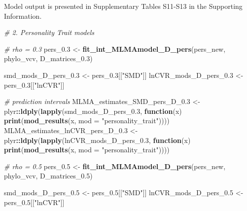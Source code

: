 \documentclass[]{article}
\newenvironment{Shaded}{\begin{snugshade}}{\end{snugshade}}
\newcommand{\KeywordTok}[1]{\textcolor[rgb]{0.13,0.29,0.53}{\textbf{#1}}}
\newcommand{\DataTypeTok}[1]{\textcolor[rgb]{0.13,0.29,0.53}{#1}}
\newcommand{\FloatTok}[1]{\textcolor[rgb]{0.00,0.00,0.81}{#1}}
\newcommand{\StringTok}[1]{\textcolor[rgb]{0.31,0.60,0.02}{#1}}
\newcommand{\CommentTok}[1]{\textcolor[rgb]{0.56,0.35,0.01}{\textit{#1}}}
\newcommand{\ControlFlowTok}[1]{\textcolor[rgb]{0.13,0.29,0.53}{\textbf{#1}}}
\newcommand{\OperatorTok}[1]{\textcolor[rgb]{0.81,0.36,0.00}{\textbf{#1}}}
\newcommand{\NormalTok}[1]{#1}
\begin{document}
Model output is presented in Supplementary Tables S11-S13 in the
Supporting Information.

\begin{Shaded}
\begin{Highlighting}[]
\CommentTok{# 2. Personality Trait models}

  \CommentTok{# rho = 0.3}
\NormalTok{    pers_}\FloatTok{0.3}\NormalTok{ <-}\StringTok{ }\KeywordTok{fit_int_MLMAmodel_D_pers}\NormalTok{(pers_new, phylo_vcv, D_matrices_}\FloatTok{0.3}\NormalTok{)}
    
\NormalTok{    smd_mods_D_pers_}\FloatTok{0.3}\NormalTok{ <-}\StringTok{ }\NormalTok{pers_}\FloatTok{0.3}\NormalTok{[[}\StringTok{"SMD"}\NormalTok{]] }
\NormalTok{    lnCVR_mods_D_pers_}\FloatTok{0.3}\NormalTok{ <-}\StringTok{ }\NormalTok{pers_}\FloatTok{0.3}\NormalTok{[[}\StringTok{"lnCVR"}\NormalTok{]] }
  
    \CommentTok{# prediction intervals}
\NormalTok{    MLMA_estimates_SMD_pers_D_}\FloatTok{0.3}\NormalTok{ <-}\StringTok{ }\NormalTok{plyr}\OperatorTok{::}\KeywordTok{ldply}\NormalTok{(}\KeywordTok{lapply}\NormalTok{(smd_mods_D_pers_}\FloatTok{0.3}\NormalTok{, }
                           \ControlFlowTok{function}\NormalTok{(x) }\KeywordTok{print}\NormalTok{(}\KeywordTok{mod_results}\NormalTok{(x, }\DataTypeTok{mod =} \StringTok{"personality_trait"}\NormalTok{)))) }
\NormalTok{    MLMA_estimates_lnCVR_pers_D_}\FloatTok{0.3}\NormalTok{ <-}\StringTok{ }\NormalTok{plyr}\OperatorTok{::}\KeywordTok{ldply}\NormalTok{(}\KeywordTok{lapply}\NormalTok{(lnCVR_mods_D_pers_}\FloatTok{0.3}\NormalTok{, }
                              \ControlFlowTok{function}\NormalTok{(x) }\KeywordTok{print}\NormalTok{(}\KeywordTok{mod_results}\NormalTok{(x, }\DataTypeTok{mod =} \StringTok{"personality_trait"}\NormalTok{)))) }

  \CommentTok{# rho = 0.5}
\NormalTok{    pers_}\FloatTok{0.5}\NormalTok{ <-}\StringTok{ }\KeywordTok{fit_int_MLMAmodel_D_pers}\NormalTok{(pers_new, phylo_vcv, D_matrices_}\FloatTok{0.5}\NormalTok{)}
    
\NormalTok{    smd_mods_D_pers_}\FloatTok{0.5}\NormalTok{ <-}\StringTok{ }\NormalTok{pers_}\FloatTok{0.5}\NormalTok{[[}\StringTok{"SMD"}\NormalTok{]] }
\NormalTok{    lnCVR_mods_D_pers_}\FloatTok{0.5}\NormalTok{ <-}\StringTok{ }\NormalTok{pers_}\FloatTok{0.5}\NormalTok{[[}\StringTok{"lnCVR"}\NormalTok{]] }
  

\end{Highlighting}
\end{Shaded}
\end{document}
